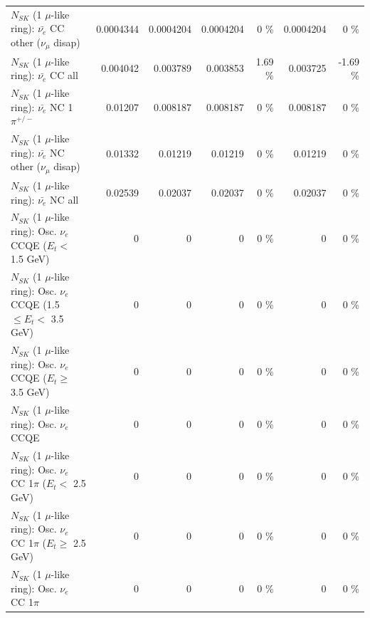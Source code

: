 \begin{table}
\begin{tabular}{| l | r | r | r  r | r  r |}
          $N_{SK}$ (1 $\mu$-like ring): $\bar{\nu_e}$ CC other ($\nu_\mu$ disap) &       0.0004344 &       0.0004204 &       0.0004204 &        0 \%  &       0.0004204 &        0 \%  \\ 
                            $N_{SK}$ (1 $\mu$-like ring): $\bar{\nu_{e}}$ CC all &        0.004042 &        0.003789 &        0.003853 &     1.69 \%  &        0.003725 &    -1.69 \%  \\ 
\hline
                     $N_{SK}$ (1 $\mu$-like ring): $\bar{\nu_e}$ NC 1$\pi^{+/-}$ &         0.01207 &        0.008187 &        0.008187 &        0 \%  &        0.008187 &        0 \%  \\ 
          $N_{SK}$ (1 $\mu$-like ring): $\bar{\nu_e}$ NC other ($\nu_\mu$ disap) &         0.01332 &         0.01219 &         0.01219 &        0 \%  &         0.01219 &        0 \%  \\ 
                            $N_{SK}$ (1 $\mu$-like ring): $\bar{\nu_{e}}$ NC all &         0.02539 &         0.02037 &         0.02037 &        0 \%  &         0.02037 &        0 \%  \\ 
\hline
\hline
\hline
             $N_{SK}$ (1 $\mu$-like ring): Osc. $\nu_e$ CCQE ($E_{t} <$ 1.5 GeV) &               0 &               0 &               0 &        0 \%  &               0 &        0 \%  \\ 
    $N_{SK}$ (1 $\mu$-like ring): Osc. $\nu_e$ CCQE (1.5 $\leq E_{t} <$ 3.5 GeV) &               0 &               0 &               0 &        0 \%  &               0 &        0 \%  \\ 
          $N_{SK}$ (1 $\mu$-like ring): Osc. $\nu_e$ CCQE ($E_{t} \geq$ 3.5 GeV) &               0 &               0 &               0 &        0 \%  &               0 &        0 \%  \\ 
\hline
                                 $N_{SK}$ (1 $\mu$-like ring): Osc. $\nu_e$ CCQE &               0 &               0 &               0 &        0 \%  &               0 &        0 \%  \\ 
\hline
        $N_{SK}$ (1 $\mu$-like ring): Osc. $\nu_e$ CC 1$\pi$ ($E_{t} <$ 2.5 GeV) &               0 &               0 &               0 &        0 \%  &               0 &        0 \%  \\ 
     $N_{SK}$ (1 $\mu$-like ring): Osc. $\nu_e$ CC 1$\pi$ ($E_{t} \geq$ 2.5 GeV) &               0 &               0 &               0 &        0 \%  &               0 &        0 \%  \\ 
\hline
                            $N_{SK}$ (1 $\mu$-like ring): Osc. $\nu_e$ CC 1$\pi$ &               0 &               0 &               0 &        0 \%  &               0 &        0 \%  \\ 

\end{tabular}
\end{table}
